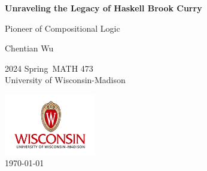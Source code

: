 
\begin{titlepage}
    \begin{center}
        \vspace*{2.7cm}
            
        \Huge
        \textbf{Unraveling the Legacy of Haskell Brook Curry}
            
        \vspace{1cm}
        \huge
        Pioneer of Compositional Logic
        \vspace{1.5cm}
        \Large
            
        Chentian Wu\vfill

        2024 Spring\ MATH 473\\
        University of Wisconsin-Madison\\
        \vspace{1cm}  
    
        \includegraphics[width=0.3\textwidth]{templates/logo-wisc.png}\\
        \vspace{1cm}  
        \Large \today
        
    \end{center}
\end{titlepage}
